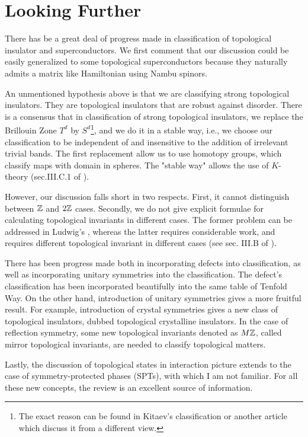 \section{Looking Further}
\label{sec:Looking Further}
There has be a great deal of progress made in classification of topological
insulator and superconductors. We first comment that our discussion could be
easily generalized to some topological superconductors because they naturally
admits a matrix like Hamiltonian using Nambu spinors.

An unmentioned hypothesis above is that we
are classifying strong topological insulators. They are topological insulators
that are robust against disorder\cite{Fu2007}. There is a consensus that in
classification of strong topological insulators, we replace the Brillouin Zone
$T^d$ by $S^d$\footnote{The exact reason can be found in Kitaev's
 classification\cite{Kitaev2009a} or another article \cite{Kennedy2015} which
discuss it from a different view.}, and we do it in a stable way, i.e., we choose
our classification to be independent of and insensitive to the addition of
irrelevant trivial bands. The first replacement allow us to use homotopy groups,
which classify maps with domain in spheres. The "stable way" allows the use of
$K$-theory (sec.III.C.1 of \cite{Chiu2016}).

However, our discussion falls short in two respects. First, it cannot distinguish
between $\mathbb{Z}$ and $2\mathbb{Z}$ cases. Secondly, we do not give explicit formulae for
calculating topological invariants in different cases. The former problem can be
addressed in Ludwig's \cite{Schnyder2008}, whereas the latter requires
considerable work, and requires different topological invariant in different
cases (see sec. III.B of \cite{Chiu2016}).

There has been progress made both in incorporating defects into classification,
as well as incorporating unitary symmetries into the classification. The
defect's classification has been incorporated beautifully into the same table of
Tenfold Way. On the other hand, introduction of unitary symmetries gives a more
fruitful result. For example, introduction of crystal symmetries gives a new
class of topological insulators, dubbed topological crystalline
insulators.\cite{Ando2015} In the case of reflection symmetry, some new topological
invariants denoted as $M\mathbb{Z}$, called mirror topological invariants, are needed to
classify topological matters\cite{Chiu2013}.

Lastly, the discussion of topological states in interaction picture extends to
the case of symmetry-protected phases (SPTs), with which I am not familiar.
For all these new concepts, the review \cite{Chiu2016} is an excellent source of
information.



